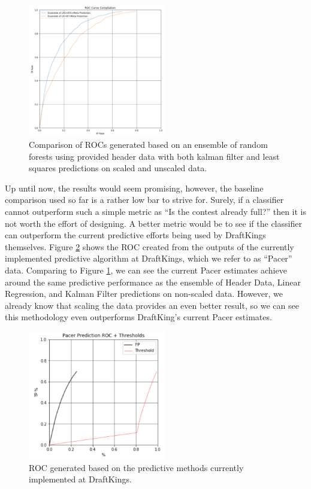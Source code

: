 \begin{figure}[h]
\centering
\includegraphics[width=6cm]{body/results/META_LR_KF_both.png}
\caption{Comparison of ROCs generated based on an ensemble of random forests using provided header data with both kalman filter and least squares predictions on scaled and unscaled data.}
\label{fig:MLRKFboth}
\end{figure}

\newpage
Up until now, the results would seem promising, however, the baseline comparison used so far is a rather low bar to strive for. Surely, if a classifier cannot outperform such a simple metric as ``Is the contest already full?'' then it is not worth the effort of designing. A better metric would be to see if the classifier can outperform the current predictive efforts being used by DraftKings themselves. Figure \ref{fig:pacer} shows the ROC created from the outputs of the currently implemented predictive algorithm at DraftKings, which we refer to as ``Pacer'' data. Comparing to Figure \ref{fig:MLRKFboth}, we can see the current Pacer estimates achieve around the same predictive performance as the ensemble of Header Data, Linear Regression, and Kalman Filter predictions on non-scaled data. However, we already know that scaling the data provides an even better result, so we can see this methodology even outperforms DraftKing's current Pacer estimates.

\begin{figure}[h]
\centering
\includegraphics[width=6cm]{body/results/pacer.png}
\caption{ROC generated based on the predictive methods currently implemented at DraftKings.}
\label{fig:pacer}
\end{figure}

